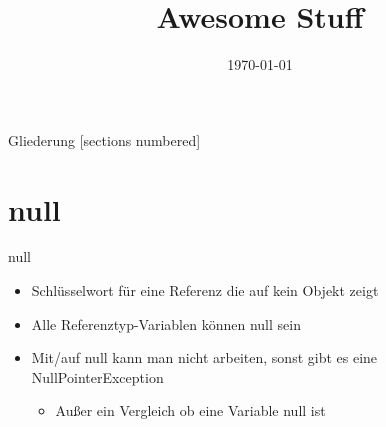 



\title{Awesome Stuff}
\date{\today}




\maketitle

\begin{frame}{Gliederung}
	[sections numbered]
	\tableofcontents
\end{frame}

\section{null}
\begin{frame}{null}
	\begin{itemize}
		\item Schlüsselwort für eine Referenz die auf kein Objekt zeigt
		\item Alle Referenztyp-Variablen können \alert{null} sein
		\item Mit/auf \alert{null} kann man nicht arbeiten, sonst gibt es eine NullPointerException
		\begin{itemize}
			\item Außer ein Vergleich ob eine Variable \alert{null} ist
		\end{itemize}
	\end{itemize}
		
\end{frame}

